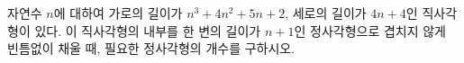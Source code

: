 자연수 $n$에 대하여 가로의 길이가 $n^3+4n^2+5n+2$, 세로의 길이가 $4n+4$인 직사각형이 있다. 이 직사각형의 내부를 한 변의 길이가 $n+1$인 정사각형으로 겹치지 않게 빈틈없이 채울 때, 필요한 정사각형의 개수를 구하시오.
\par\smallskip\begin{center}\resizebox{\ifdim\width>\linewidth\linewidth\else\width\fi}{!}{}\end{center}
